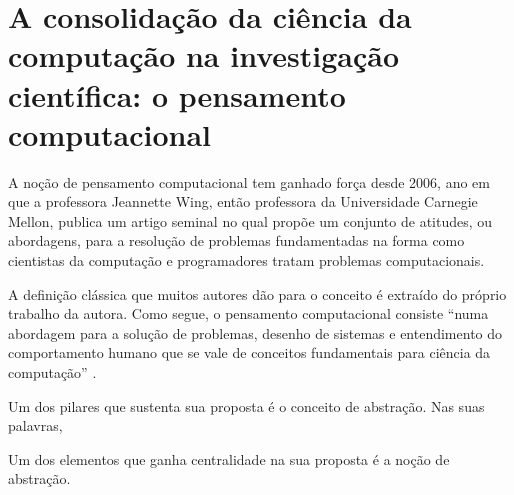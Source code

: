 \section{A consolidação da ciência da computação na investigação científica: o pensamento computacional}

A noção de pensamento computacional tem ganhado força desde 2006, ano em que a professora Jeannette Wing, então professora da Universidade Carnegie Mellon, publica um artigo seminal no qual propõe um conjunto de atitudes, ou abordagens, para a resolução de problemas fundamentadas na forma como cientistas da computação e programadores tratam problemas computacionais. 

A definição clássica que muitos autores dão para o conceito é extraído do próprio trabalho da autora. Como segue, o pensamento computacional consiste ``numa abordagem para a solução de problemas, desenho de sistemas e entendimento do comportamento humano que se vale de conceitos fundamentais para ciência da computação'' \cite[Tradução nossa]{wing2006}.

Um dos pilares que sustenta sua proposta é o conceito de abstração. Nas suas palavras, 

Um dos elementos que ganha centralidade na sua proposta é a noção de abstração. 











